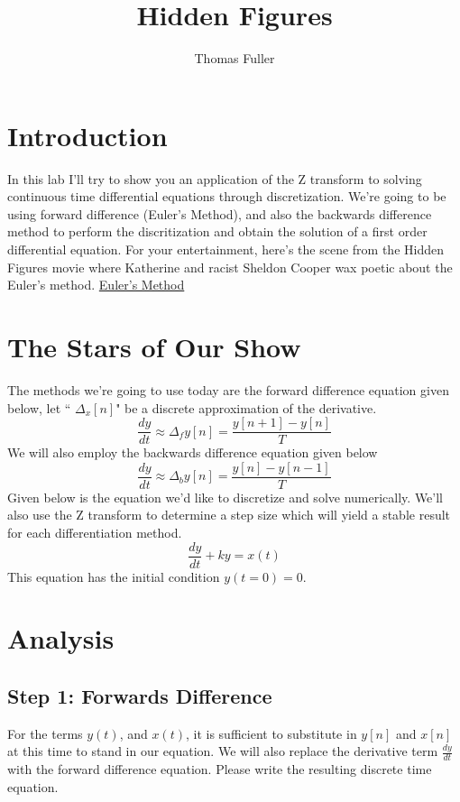 \documentclass[10pt,a4paper]{article}
\author{Thomas Fuller}
\title{Hidden Figures}
\begin{document}
\maketitle
\section*{Introduction}
In this lab I'll try to show you an application of the Z transform to solving continuous time differential equations through discretization. We're going to be using forward difference (Euler's Method), and also the backwards difference method to perform the discritization and obtain the solution of a first order differential equation.  For your entertainment, here's the scene from the Hidden Figures movie where Katherine and racist Sheldon Cooper wax poetic about the Euler's method. 
\href{https://www.youtube.com/watch?v=v-pbGAts_Fg}{Euler's Method}
\section*{The Stars of Our Show}
The methods we're going to use today are the forward difference equation given below, let `` $\Delta_{x}[n]$" be a discrete approximation of the derivative. 
\begin{equation}
\frac{dy}{dt} \approx \Delta_{f}y[n] = \frac{y[n+1] - y[n]}{T}
\end{equation}
We will also employ the backwards difference equation given below
\begin{equation}
\frac{dy}{dt} \approx \Delta_{b}y[n] = \frac{y[n] - y[n-1]}{T}
\end{equation}
Given below is the equation we'd like to discretize and solve numerically.  We'll also use the Z transform to determine a step size which will yield a stable result for each differentiation method.
\begin{equation}
\frac{dy}{dt} +ky = x(t)  
\end{equation}
This equation has the initial condition $y(t=0) = 0$.  
\section*{Analysis}
\subsection*{Step 1: Forwards Difference}
For the terms $y(t)$, and $x(t)$, it is sufficient to substitute in $y[n]$ and $x[n]$ at this time to stand in our equation.  We will also replace the derivative term $\frac{dy}{dt}$ with the forward difference equation. Please write the resulting discrete time equation.
\end{document}
